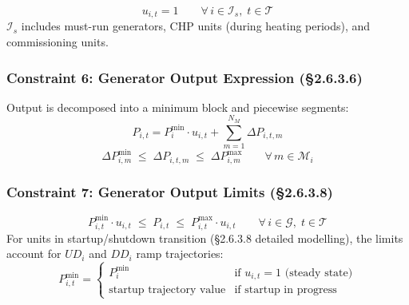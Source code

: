 \begin{equation}\label{eq:must-run}
  u_{i,t} = 1 \qquad \forall\, i \in \mathcal{I}_s,\; t \in \mathcal{T}
\end{equation}
$\mathcal{I}_s$ includes must-run generators, CHP units (during heating
periods), and commissioning units.

\subsubsection{Constraint 6: Generator Output Expression (§2.6.3.6)}\label{sec:scuc-gen-output}

Output is decomposed into a minimum block and piecewise segments:
\begin{equation}\label{eq:gen-output}
  P_{i,t} = P^{\min}_i \cdot u_{i,t} + \sum_{m=1}^{N_M} \Delta P_{i,t,m}
\end{equation}
\begin{equation}\label{eq:seg-bounds}
  \Delta P^{\min}_{i,m} \;\leq\; \Delta P_{i,t,m} \;\leq\; \Delta P^{\max}_{i,m}
  \qquad \forall\, m \in \mathcal{M}_i
\end{equation}

\subsubsection{Constraint 7: Generator Output Limits (§2.6.3.8)}\label{sec:scuc-gen-limits}

\begin{equation}\label{eq:gen-limits}
  P^{\min}_{i,t} \cdot u_{i,t}
  \;\leq\; P_{i,t} \;\leq\;
  P^{\max}_{i,t} \cdot u_{i,t}
  \qquad \forall\, i \in \mathcal{G},\; t \in \mathcal{T}
\end{equation}
For units in startup/shutdown transition (§2.6.3.8 detailed modelling),
the limits account for $UD_i$ and $DD_i$ ramp trajectories:
\begin{equation}\label{eq:startup-traj}
  P^{\min}_{i,t} =
  \begin{cases}
    P^{\min}_i & \text{if } u_{i,t}=1 \text{ (steady state)} \\
    \text{startup trajectory value} & \text{if startup in progress}
  \end{cases}
\end{equation}

